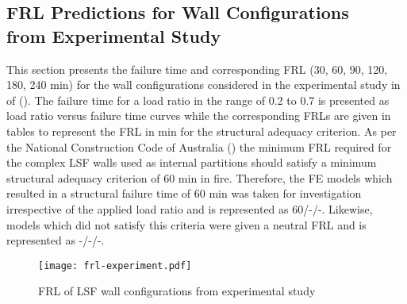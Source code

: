 \subsection[FRL Predictions for Wall Configurations from Experimental Study]{FRL Predictions for Wall Configurations \\from Experimental Study}

This section presents the failure time and corresponding FRL (30, 60, 90, 120, 180, 240 min) for the wall configurations considered in the experimental study in  of  (). The failure time for a load ratio in the range of 0.2 to 0.7 is presented as load ratio versus failure time curves while the corresponding FRLs are given in tables to represent the FRL in min for the structural adequacy criterion. As per the National Construction Code of Australia (\citet{ncc2019}) the minimum FRL required for the complex LSF walls used as internal partitions should satisfy a minimum structural adequacy criterion of 60 min in fire. Therefore, the FE models which resulted in a structural failure time of 60 min was taken for investigation irrespective of the applied load ratio and is represented as 60/-/-. Likewise, models which did not satisfy this criteria were given a neutral FRL and is represented as -/-/-.   
\begin{figure}[!htbp]
	\centering
	\texttt{[image: frl-experiment.pdf]}
	\caption{FRL of LSF wall configurations from experimental study}
	\label{fig:frl-experiment}
\end{figure}

